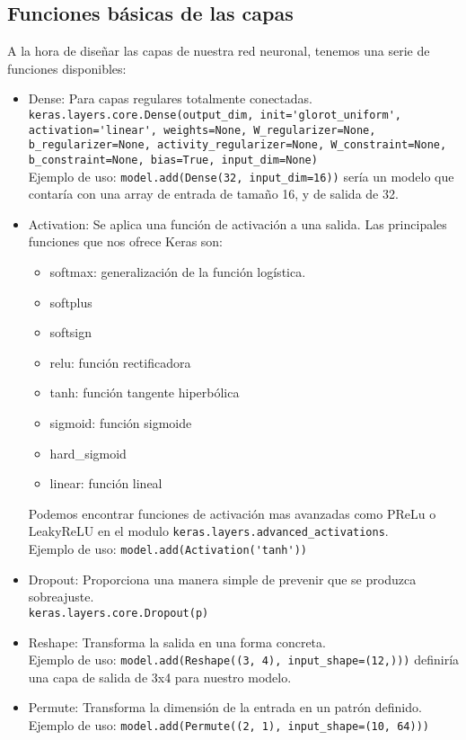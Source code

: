 \subsection{Funciones básicas de las capas}
A la hora de diseñar las capas de nuestra red neuronal, tenemos una serie de funciones disponibles:
\begin{itemize}
\item Dense: Para capas regulares totalmente conectadas.\\
\lstinline{keras.layers.core.Dense(output_dim, init='glorot_uniform', activation='linear', weights=None, W_regularizer=None, b_regularizer=None, activity_regularizer=None, W_constraint=None, b_constraint=None, bias=True, input_dim=None)}\\
Ejemplo de uso: \lstinline{model.add(Dense(32, input_dim=16))} sería un modelo que contaría con una array de entrada de tamaño 16, y de salida de 32.
\item Activation: Se aplica una función de activación a una salida. Las principales funciones que nos ofrece Keras son:
\begin{itemize}
\item softmax: generalización de la función logística.
\item softplus
\item softsign
\item relu: función rectificadora
\item tanh: función tangente hiperbólica
\item sigmoid: función sigmoide
\item hard\_sigmoid
\item linear: función lineal
\end{itemize}
Podemos encontrar funciones de activación mas avanzadas como PReLu o LeakyReLU en el modulo \lstinline{keras.layers.advanced_activations}.\\
Ejemplo de uso: \lstinline{model.add(Activation('tanh'))}
\item Dropout: Proporciona una manera simple de prevenir que se produzca sobreajuste.\\
\lstinline{keras.layers.core.Dropout(p)}
\item Reshape: Transforma la salida en una forma concreta.\\
Ejemplo de uso: \lstinline{model.add(Reshape((3, 4), input_shape=(12,)))} definiría una capa de salida de 3x4 para nuestro modelo.
\item Permute: Transforma la dimensión de la entrada en un patrón definido.\\
Ejemplo de uso: \lstinline{model.add(Permute((2, 1), input_shape=(10, 64)))}
\end{itemize}


